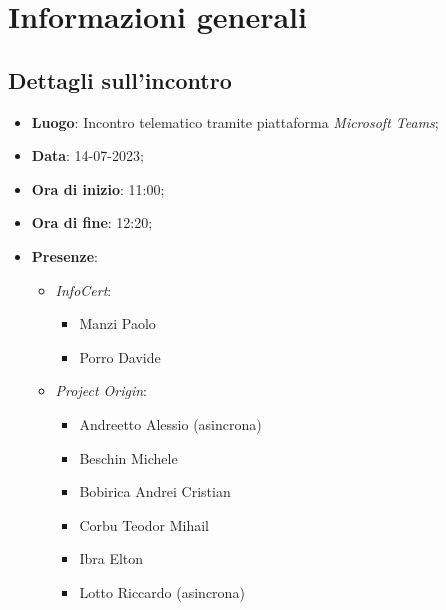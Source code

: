 \section{Informazioni generali}

\subsection{Dettagli sull'incontro}
\begin{itemize}
\item \textbf{Luogo}: Incontro telematico tramite piattaforma \textit{Microsoft Teams\glo};
\item \textbf{Data}: 14-07-2023;
\item \textbf{Ora di inizio}: 11:00;
\item \textbf{Ora di fine}: 12:20;
\item \textbf{Presenze}: 
\begin{itemize}
    \item \textit{InfoCert}: \begin{itemize}
            \item Manzi Paolo
            \item Porro Davide 
        \end{itemize}  
    \item \textit{Project Origin}:  \begin{itemize}
        \item Andreetto Alessio (asincrona)
        \item Beschin Michele
        \item Bobirica Andrei Cristian
        \item Corbu Teodor Mihail
        \item Ibra Elton
        \item Lotto Riccardo (asincrona)
    \end{itemize}	
\end{itemize}
\end{itemize}



